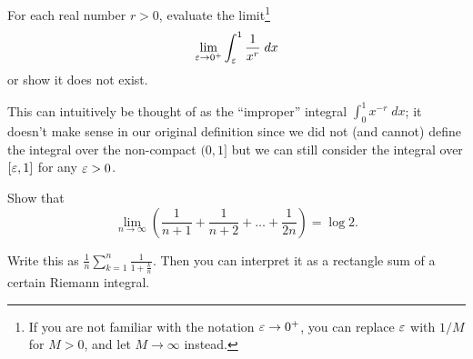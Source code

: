 \begin{sproblem}
	\label{prob:improper}
	For each real number $r > 0$,
	evaluate the limit\footnote{If you are not
		familiar with the notation $\varepsilon \to 0^+$,
		you can replace $\varepsilon$ with $1/M$ for $M > 0$,
		and let $M \to \infty$ instead.}
	\[ \lim_{\varepsilon \to 0^+} \int_\varepsilon^1 \frac{1}{x^r} \; dx \]
	or show it does not exist.

	This can intuitively be thought of as
	the ``improper'' integral $\int_0^1 x^{-r} \; dx$;
	it doesn't make sense in our original definition since
	we did not (and cannot) define the integral
	over the non-compact $(0,1]$ %
	but we can still consider the integral over $[\varepsilon,1]$
	for any $\varepsilon > 0$.
\end{sproblem}

\begin{problem}
	Show that
	\[ \lim_{n \to \infty}
		\left( \frac{1}{n+1} + \frac{1}{n+2} + \dots + \frac{1}{2n} \right)
		= \log 2.  \]
	\begin{hint}
		Write this as $\frac1n \sum_{k=1}^n \frac{1}{1+\frac kn}$.
		Then you can interpret it as a rectangle sum
		of a certain Riemann integral.
	\end{hint}
\end{problem}

